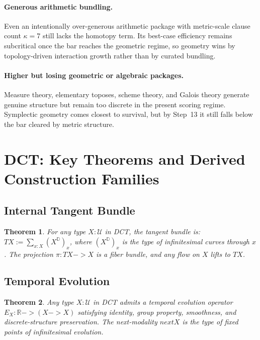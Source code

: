 \documentclass[11pt,a4paper]{article}
\def\to{->}%
\def\bigcirc{next}%
\theoremstyle{plain}
\newtheorem{theorem}{Theorem}[section]
\theoremstyle{definition}
\theoremstyle{remark}
\newcommand{\R}{\mathbb{R}}
\newcommand{\D}{\mathbb{D}}
\newcommand{\U}{\mathcal{U}}
\begin{document}
\paragraph{Generous arithmetic bundling.}
Even an intentionally over-generous arithmetic package with metric-scale clause count $\kappa=7$ still lacks the homotopy term.
Its best-case efficiency remains subcritical once the bar reaches the geometric regime, so geometry wins by topology-driven interaction growth rather than by curated bundling.

\paragraph{Higher but losing geometric or algebraic packages.}
Measure theory, elementary toposes, scheme theory, and Galois theory generate genuine structure but remain too discrete in the present scoring regime.
Symplectic geometry comes closest to survival, but by Step~13 it still falls below the bar cleared by metric structure.

\section{DCT: Key Theorems and Derived Construction Families}
\label{app:dct}

\subsection{Internal Tangent Bundle}

\begin{theorem}
\label{thm:tangent}
For any type $X : \U$ in DCT, the tangent bundle is:
$TX := \sum_{x : X} (X^{\D})_x$,
where $(X^{\D})_x$ is the type of infinitesimal curves through $x$.
The projection $\pi : TX \to X$ is a fiber bundle, and any flow on $X$ lifts to $TX$.
\end{theorem}

\subsection{Temporal Evolution}

\begin{theorem}
\label{thm:temporal}
Any type $X : \U$ in DCT admits a temporal evolution operator $E_X : \R \to (X \to X)$ satisfying identity, group property, smoothness, and discrete-structure preservation.
The next-modality $\bigcirc X$ is the type of fixed points of infinitesimal evolution.
\end{theorem}
\end{document}
